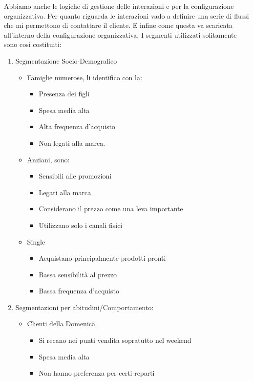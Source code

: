 \documentclass[11pt]{article}
\begin{document}
Abbiamo anche le logiche di gestione delle interazioni e per la configurazione organizzativa. 
Per quanto riguarda le interazioni vado a definire una serie di flussi che mi permettono di contattare il cliente.
E infine come questa va scaricata all'interno della configurazione organizzativa.
I segmenti utilizzati solitamente sono così costituiti:
\begin{enumerate}[topsep=0ex]
	\item Segmentazione Socio-Demografico
	\begin{itemize}[noitemsep,topsep=0ex]
		\item Famiglie numerose, li identifico con la:
		\begin{itemize}[noitemsep,topsep=0ex]
			\item Presenza dei figli
			\item Spesa media alta
			\item Alta frequenza d'acquisto
			\item Non legati alla marca.
		\end{itemize}
		\item Anziani, sono:
		\begin{itemize}[noitemsep,topsep=0ex]
			\item Sensibili alle promozioni
			\item Legati alla marca
			\item Considerano il prezzo come una leva importante
			\item Utilizzano solo i canali fisici
		\end{itemize}
		\item Single
		\begin{itemize}[noitemsep,topsep=0ex]
			\item Acquistano principalmente prodotti pronti
			\item Bassa sensibilità al prezzo
			\item Bassa frequenza d'acquisto
		\end{itemize}
	\end{itemize}
	\item Segmentazioni per abitudini/Comportamento:
	\begin{itemize}[topsep=0ex,noitemsep]
		\item Clienti della Domenica
		\begin{itemize}[topsep=0ex,noitemsep]
			\item Si recano nei punti vendita sopratutto nel weekend
			\item Spesa media alta
			\item Non hanno preferenza per certi reparti

\end{itemize}
\end{itemize}
\end{enumerate}
\end{document}
